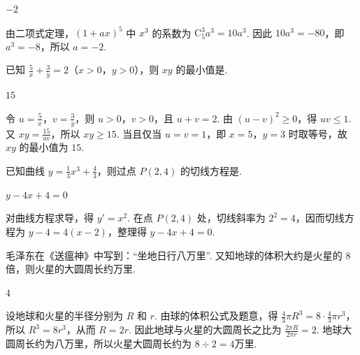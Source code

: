 \begin{answer}
\(-2\)
\end{answer}

\begin{solution}
由二项式定理，\((1+ax)^5\) 中 \(x^3\) 的系数为 \(\mathrm C_5^3a^3=10a^3\). 因此 \(10a^3=-80\)，即 \(a^3=-8\)，所以 \(a=-2\).
\end{solution}

\begin{problem}
已知 \( \frac{5}{x} + \frac{3}{y} = 2 \)（\(x > 0\)，\(y > 0\)），则 \(xy\) 的最小值是\fillinblank{}.
\end{problem}

\begin{answer}
\(15\)
\end{answer}

\begin{solution}
令 \(u=\frac{5}{x}\)，\(v=\frac{3}{y}\)，则 \(u>0\)，\(v>0\)，且 \(u+v=2\). 由 \((u-v)^2\geqslant0\)，得 \(uv\leqslant1\). 又 \(xy=\frac{15}{uv}\)，所以 \(xy\geqslant15\). 当且仅当 \(u=v=1\)，即 \(x=5\)，\(y=3\) 时取等号，故 \(xy\) 的最小值为 \(15\).
\end{solution}

\begin{problem}
已知曲线 \( y = \frac{1}{3} x^3 + \frac{4}{3} \)，则过点 \( P(2,4) \) 的切线方程是\fillinblank{}.
\end{problem}

\begin{answer}
\(y-4x+4=0\)
\end{answer}

\begin{solution}
对曲线方程求导，得 \(y'=x^2\). 在点 \(P(2,4)\) 处，切线斜率为 \(2^2=4\)，因而切线方程为 \(y-4=4(x-2)\)，整理得 \(y-4x+4=0\).
\end{solution}

\begin{problem}
毛泽东在《送瘟神》中写到：“坐地日行八万里”. 又知地球的体积大约是火星的 \(8\) 倍，则火星的大圆周长约\fillinblank{}\(\text{万里}\).
\end{problem}

\begin{answer}
\(4\)
\end{answer}

\begin{solution}
设地球和火星的半径分别为 \(R\) 和 \(r\). 由球的体积公式及题意，得 \(\frac{4}{3}\pi R^3=8\cdot\frac{4}{3}\pi r^3\)，所以 \(R^3=8r^3\)，从而 \(R=2r\). 因此地球与火星的大圆周长之比为 \(\frac{2\pi R}{2\pi r}=2\). 地球大圆周长约为八万里，所以火星大圆周长约为 \(8\div2=4\)\(\text{万里}\).
\end{solution}

